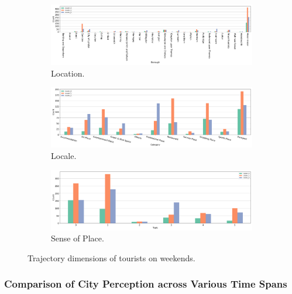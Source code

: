\documentclass{article}
\theoremstyle{definition}
\theoremstyle{remark}
\begin{document}
\begin{figure}[!h]

\centering
\begin{subfigure}{0.6\textheight}
\centering
\includegraphics[width=1\linewidth]{figures/traj_location_weekend_tourists.png}
\caption{Location.}
\label{fig:traj_location_weekend_tourists}
\end{subfigure}
\begin{subfigure}{0.6\textheight}
\centering
\includegraphics[width=1\linewidth]{figures/traj_locale_weekend_tourists.png}
\caption{Locale.}
\label{fig:traj_locale_weekend_tourists}
\end{subfigure}
\begin{subfigure}{0.6\textheight}
\centering
\includegraphics[width=1\linewidth]{figures/traj_sense_weekend_tourists.png}
\caption{Sense of Place.}
\label{fig:traj_sense_weekend_tourists}
\end{subfigure}

\caption{Trajectory dimensions of tourists on weekends.}
\label{fig:traj_dimension_weekend_tourists}
\end{figure}

\subsubsection{Comparison of City Perception across Various Time Spans} \label{comparison_perception}
\end{document}
